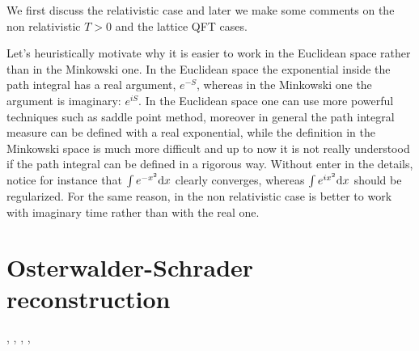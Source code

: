 \documentclass[../main/main.tex]{subfiles}
\begin{document}
We first discuss the relativistic case and later we make some comments on the non relativistic $T>0$ and the lattice QFT cases.

Let's heuristically motivate why it is easier to work in the Euclidean space rather than in the Minkowski one. In the Euclidean space the exponential inside the path integral has a real argument, $e^{-S}$, whereas in the Minkowski one the argument is imaginary: $e^{iS}$. In the Euclidean space one can use more powerful techniques such as saddle point method, moreover in general the path integral measure can be defined with a real exponential, while the definition in the Minkowski space is much more difficult and up to now it is not really understood if the path integral can be defined in a rigorous way. Without enter in the details, notice for instance that $\int e^{-x^2}\textnormal{d} x$ clearly converges, whereas $\int e^{ix^2}\textnormal{d} x$ should be regularized. For the same reason, in the non relativistic case is better to work with imaginary time rather than with the real one.
 
\section{Osterwalder-Schrader reconstruction}

\cite{Osterwalder:1973}, \cite{Osterwalder:1974}, \cite{Osterwalder:1973a}, \cite[Chapter 5]{Strocchi_2013}, \cite[Chapter 3]{Strocchi:1993}\\
\end{document}
